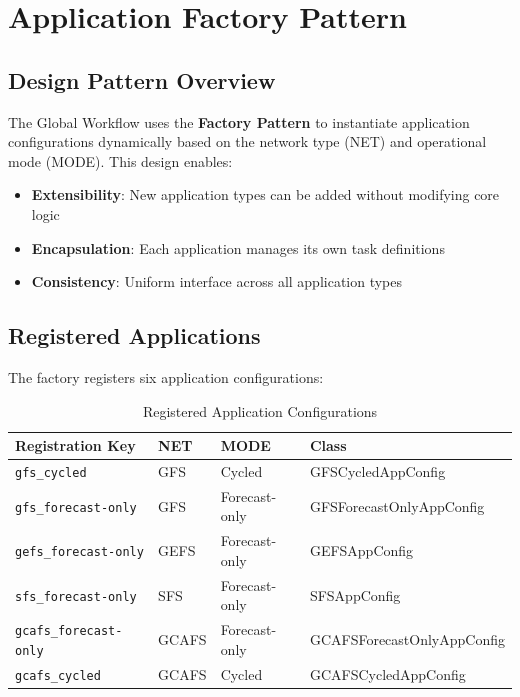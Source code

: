 \documentclass[11pt,letterpaper]{article}
\begin{document}

\section{Application Factory Pattern}

\subsection{Design Pattern Overview}

The Global Workflow uses the \textbf{Factory Pattern} to instantiate application configurations dynamically based on the network type (NET) and operational mode (MODE). This design enables:

\begin{itemize}
    \item \textbf{Extensibility}: New application types can be added without modifying core logic
    \item \textbf{Encapsulation}: Each application manages its own task definitions
    \item \textbf{Consistency}: Uniform interface across all application types
\end{itemize}

\subsection{Registered Applications}

The factory registers six application configurations:

\begin{table}[H]
\centering
\caption{Registered Application Configurations}
\label{tab:applications}
\begin{tabular}{@{}llll@{}}
\toprule
\textbf{Registration Key} & \textbf{NET} & \textbf{MODE} & \textbf{Class} \\
\midrule
\texttt{gfs\_cycled} & GFS & Cycled & GFSCycledAppConfig \\
\texttt{gfs\_forecast-only} & GFS & Forecast-only & GFSForecastOnlyAppConfig \\
\texttt{gefs\_forecast-only} & GEFS & Forecast-only & GEFSAppConfig \\
\texttt{sfs\_forecast-only} & SFS & Forecast-only & SFSAppConfig \\
\texttt{gcafs\_forecast-only} & GCAFS & Forecast-only & GCAFSForecastOnlyAppConfig \\
\texttt{gcafs\_cycled} & GCAFS & Cycled & GCAFSCycledAppConfig \\
\bottomrule
\end{tabular}
\end{table}
\end{document}
